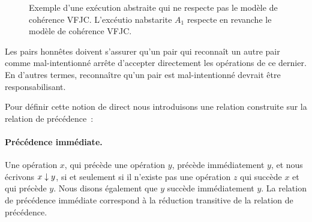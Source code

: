 \begin{figure}[htb]
\centering
{}
\caption{Exemple d'une exécution abstraite qui ne respecte pas le modèle de cohérence \ac{VFJC}.
L'excéutio nabstarite $A_1$ respecte en revanche le modèle de cohérence \ac{VFJC}.}\label{fig:known-colluding-malicious}
\end{figure}

Les pairs honnêtes doivent s'assurer qu'un pair qui reconnaît un autre pair comme mal-intentionné arrête d'accepter directement les opérations de ce dernier.
En d'autres termes, reconnaître qu'un pair est mal-intentionné devrait être responsabilisant.

Pour définir cette notion de direct nous introduisons une relation construite sur la relation de précédence~:

\paragraph{Précédence immédiate.}
Une opération $x$, qui précède une opération $y$, précède immédiatement $y$, et nous écrivons $x \downarrow y$, si et seulement si il n'existe pas une opération $z$ qui succède $x$ et qui précède $y$.
Nous disons également que $y$ succède immédiatement $y$.
La relation de précédence immédiate correspond à la réduction transitive de la relation de précédence.

